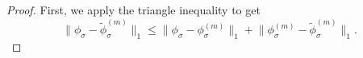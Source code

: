 \begin{proof}
    First, we apply the triangle inequality to get
    \begin{equation}
        \lVert \phi_{\sigma} - \widetilde{\phi}_{\sigma}^{(m)} \rVert _1
            \leq \lVert \phi_{\sigma} - \phi_{\sigma}^{(m)} \rVert _1 + \lVert \phi_{\sigma}^{(m)} - \widetilde{\phi}_{\sigma}^{(m)} \rVert _1.
    \end{equation}


\end{proof}
